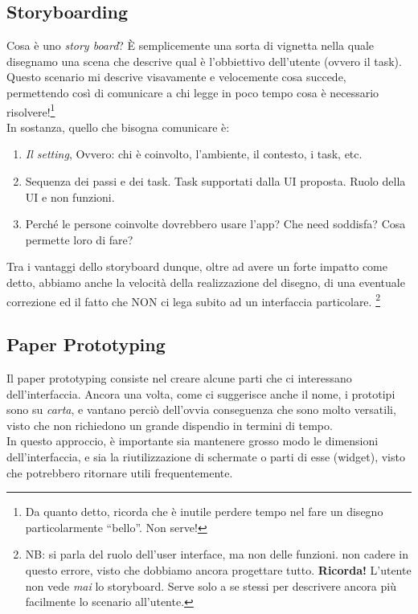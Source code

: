 \documentclass[oneside]{book}
\begin{document}
		\subsection{Storyboarding}
			Cosa è uno \emph{story board}? È semplicemente una sorta di vignetta nella quale disegnamo una scena che descrive qual è l'obbiettivo dell'utente (ovvero il task). \\
			Questo scenario mi descrive visavamente e velocemente cosa succede, permettendo così di comunicare a chi legge in poco tempo cosa è necessario risolvere!\footnote{ Da quanto detto, ricorda che è inutile perdere tempo nel fare un disegno particolarmente ``bello''. Non serve!}\\
			In sostanza, quello che bisogna comunicare è:
			\begin{enumerate}
			\item \emph{Il setting}, Ovvero: chi è coinvolto, l'ambiente, il contesto, i task, etc.
			\item Sequenza dei passi e dei task. Task supportati dalla UI proposta. Ruolo della UI e non funzioni.
			\item Perché le persone coinvolte dovrebbero usare l'app? Che need soddisfa? Cosa permette loro di fare?
			\end{enumerate}
			Tra i vantaggi dello storyboard dunque, oltre ad avere un forte impatto come detto, abbiamo anche la velocità della realizzazione del disegno, di una eventuale correzione ed il fatto che NON ci lega subito ad un interfaccia particolare. \footnote{ NB: si parla del ruolo dell'user interface, ma non delle funzioni. non cadere in questo errore, visto che dobbiamo ancora progettare tutto. \textbf{Ricorda!} L'utente non vede \emph{mai} lo storyboard. Serve solo a se stessi per descrivere ancora più facilmente lo scenario all'utente.}

		\subsection{Paper Prototyping} \label{sez:PaperPrototyping}
			Il paper prototyping consiste nel creare alcune parti che ci interessano dell'interfaccia. Ancora una volta, come ci suggerisce anche il nome, i prototipi sono su \emph{carta}, e vantano perciò dell'ovvia conseguenza che sono molto versatili, visto che non richiedono un grande dispendio in termini di tempo. \\
			In questo approccio, è importante sia mantenere grosso modo le dimensioni dell'interfaccia, e sia la riutilizzazione di schermate o parti di esse (widget), visto che potrebbero ritornare utili frequentemente. \\
\end{document}
